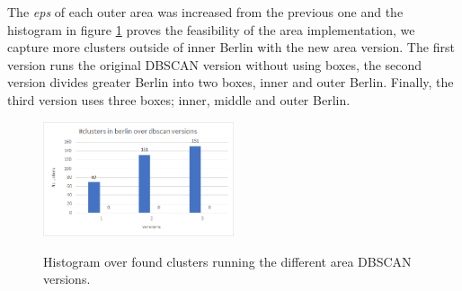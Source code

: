 The \textit{eps} of each outer area was increased from the previous one and the histogram in figure \ref{fig:clusters_versions} proves the feasibility of the area implementation, we capture more clusters outside of inner Berlin with the new area version. The first version runs the original DBSCAN version without using boxes, the second version divides greater Berlin into two boxes, inner and outer Berlin. Finally, the third version uses three boxes; inner, middle and outer Berlin.\begin{figure}
    \centering
    \includegraphics[width=0.5\textwidth]{images/clusters_versions.png}\\
    \caption{ Histogram over found clusters running the different area DBSCAN versions.}
    \label{fig:clusters_versions}
\end{figure}


